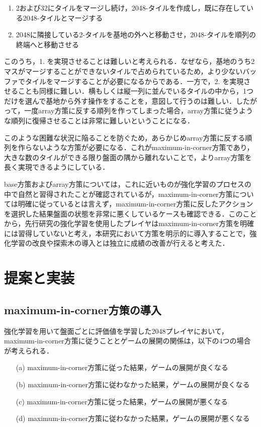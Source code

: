 \documentclass{suribt}
\begin{document}
\begin{enumerate}
\item 2および32にタイルをマージし続け，2048-タイルを作成し，既に存在している2048-タイルとマージする
\item 2048に隣接している2-タイルを基地の外へと移動させ，2048-タイルを順列の終端へと移動させる
\end{enumerate}

このうち，1. を実現させることは難しいと考えられる．なぜなら，基地のうち2マスがマージすることができないタイルで占められているため，より少ないバッファでタイルをマージすることが必要になるからである．一方で，2. を実現させることも同様に難しい．横もしくは縦一列に並んでいるタイルの中から，1つだけを選んで基地から外す操作をすることを，意図して行うのは難しい．したがって，一度array方策に反する順列を作ってしまった場合，array方策に従うような順列に復帰させることは非常に難しいということになる．

このような困難な状況に陥ることを防ぐため，あらかじめarray方策に反する順列を作らないような方策が必要になる．これがmaximum-in-corner方策であり，大きな数のタイルができる限り盤面の隅から離れないことで，よりarray方策を長く実現できるようにしている．

base方策およびarray方策については，これに近いものが強化学習のプロセスの中で自然と習得されたことが確認されているが，maximum-in-corner方策については明確に従っているとは言えず，maximum-in-corner方策に反したアクションを選択した結果盤面の状態を非常に悪くしているケースも確認できる．このことから，先行研究の強化学習を使用したプレイヤはmaximum-in-corner方策を明確には習得していないと考え，本研究において方策を明示的に導入することで，強化学習の改良や探索木の導入とは独立に成績の改善が行えると考えた．

\chapter{提案と実装}
\section{maximum-in-corner方策の導入}
強化学習を用いて盤面ごとに評価値を学習した2048プレイヤにおいて，maximum-in-corner方策に従うこととゲームの展開の関係は，以下の4つの場合が考えられる．

\begin{enumerate}
\item[(a)] maximum-in-corner方策に従った結果，ゲームの展開が良くなる
\item[(b)] maximum-in-corner方策に従わなかった結果，ゲームの展開が良くなる
\item[(c)] maximum-in-corner方策に従った結果，ゲームの展開が悪くなる
\item[(d)] maximum-in-corner方策に従わなかった結果，ゲームの展開が悪くなる
\end{enumerate}
\end{document}
